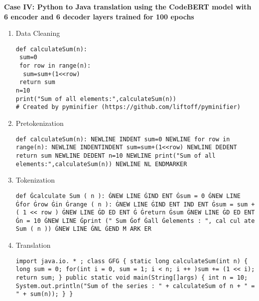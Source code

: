 \textbf{Case IV: Python to Java translation using the CodeBERT model with 6 encoder and 6 decoder layers trained for 100 epochs }
\begin{enumerate}[topsep = 0pt, label = \roman*.]
\item Data Cleaning \\
\vspace*{-\baselineskip}
\begin{Verbatim}[frame=single, breaklines=true, breakanywhere=true]
def calculateSum(n):
 sum=0
 for row in range(n):
  sum=sum+(1<<row)
 return sum
n=10
print("Sum of all elements:",calculateSum(n))
# Created by pyminifier (https://github.com/liftoff/pyminifier)
\end{Verbatim}

\item Pretokenization \\
\vspace*{-\baselineskip}
\begin{Verbatim}[frame=single, breaklines=true, breakanywhere=true]
def calculateSum(n): NEWLINE INDENT sum=0 NEWLINE for row in range(n): NEWLINE INDENTINDENT sum=sum+(1<<row) NEWLINE DEDENT  return sum NEWLINE DEDENT n=10 NEWLINE print("Sum of all elements:",calculateSum(n)) NEWLINE NL ENDMARKER
\end{Verbatim}

\item Tokenization \\
\vspace*{-\baselineskip}
\begin{Verbatim}[frame=single, breaklines=true, breakanywhere=true]
def Ġcalculate Sum ( n ): ĠNEW LINE ĠIND ENT Ġsum = 0 ĠNEW LINE Ġfor Ġrow Ġin Ġrange ( n ): ĠNEW LINE ĠIND ENT IND ENT Ġsum = sum +( 1 << row ) ĠNEW LINE ĠD ED ENT Ġ Ġreturn Ġsum ĠNEW LINE ĠD ED ENT Ġn = 10 ĠNEW LINE Ġprint (" Sum Ġof Ġall Ġelements : ", cal cul ate Sum ( n )) ĠNEW LINE ĠNL ĠEND M ARK ER
\end{Verbatim}

\item Translation \\
\vspace*{-\baselineskip}
\begin{Verbatim}[frame=single, breaklines=true, breakanywhere=true]
import java.io. * ; class GFG { static long calculateSum(int n) { long sum = 0; for(int i = 0, sum = 1; i < n; i ++ )sum += (1 << i); return sum; } public static void main(String[]args) { int n = 10; System.out.println("Sum of the series : " + calculateSum of n + " = " + sum(n)); } }
\end{Verbatim}


\end{enumerate}
